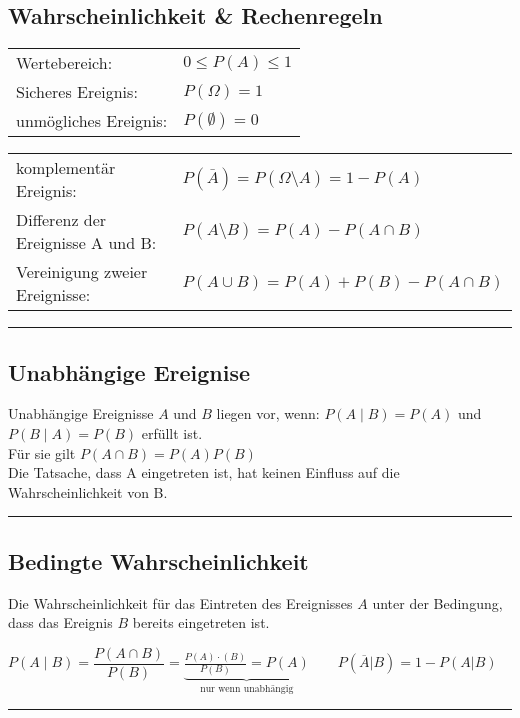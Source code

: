\subsection{Wahrscheinlichkeit \& Rechenregeln }
\begin{tabular}{ll}
  Wertebereich:         & ${0}\le{P(A)}\le{1}$\\
  Sicheres Ereignis:    & $P(\Omega)=1$\\
  unmögliches Ereignis: & $P(\emptyset)=0$
\end{tabular}
		\begin{tabular}{ll}
			komplementär Ereignis:
			&$P(\bar{A})=P({\Omega}\setminus{A})=1-P(A)$\\
			Differenz der Ereignisse A und B:
			&$P({A}\setminus{B})=P(A)-P({A}\cap{B})$\\
			Vereinigung zweier Ereignisse:
			&$P({A}\cup{B})=P(A)+P(B)-P({A}\cap{B})$
		\end{tabular}
\hrule

\subsection{Unabhängige Ereignise  }
		Unabhängige Ereignisse $A$ und $B$ liegen vor, wenn: \hspace*{5mm} $P(A\mid
		B)=P(A)$ \hspace{4mm} und \hspace{4mm} $P(B\mid A)=P(B)$ \hspace*{5mm} erfüllt
		ist. \\
		Für sie gilt \hspace*{5mm} $P(A\cap B)=P(A)P(B)$\\
    	Die Tatsache, dass A eingetreten ist, hat keinen Einfluss auf die 
		Wahrscheinlichkeit von B.\\
\hrule

\subsection{Bedingte Wahrscheinlichkeit  }
Die Wahrscheinlichkeit für das Eintreten des Ereignisses $A$ unter der
Bedingung, dass das Ereignis $B$ bereits eingetreten ist.
\begin{center}
  $P(A\mid B)= \dfrac{P(A\cap B)}{P(B)}=\underbrace{\frac{P(A)\cdot
  (B)}{P(B)}=P(A)}_{\text{nur wenn unabhängig}} \qquad P(\overline{A}|B) = 1 -
  P(A|B)$
\end{center}
\hrule

